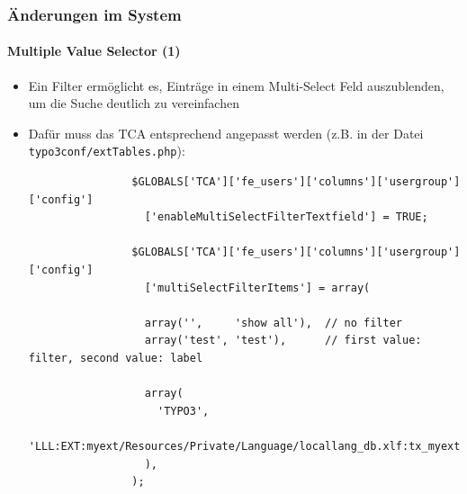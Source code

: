 \begin{frame}[fragile]
	\frametitle{Änderungen im System}
	\framesubtitle{Multiple Value Selector (1)}

	\begin{itemize}
		\item Ein Filter ermöglicht es, Einträge in einem Multi-Select Feld auszublenden, um die Suche deutlich zu vereinfachen
		\item Dafür muss das TCA entsprechend angepasst werden\newline
			\small(z.B. in der Datei \texttt{typo3conf/extTables.php}):\normalsize

			\lstset{
				basicstyle=\tiny\ttfamily
			}

			\begin{lstlisting}
				$GLOBALS['TCA']['fe_users']['columns']['usergroup']['config']
				  ['enableMultiSelectFilterTextfield'] = TRUE;

				$GLOBALS['TCA']['fe_users']['columns']['usergroup']['config']
				  ['multiSelectFilterItems'] = array(

				  array('',     'show all'),  // no filter
				  array('test', 'test'),      // first value: filter, second value: label

				  array(
				    'TYPO3',
				    'LLL:EXT:myext/Resources/Private/Language/locallang_db.xlf:tx_myext.label.typo3'
				  ),
				);
			\end{lstlisting}

	\end{itemize}

\end{frame}


